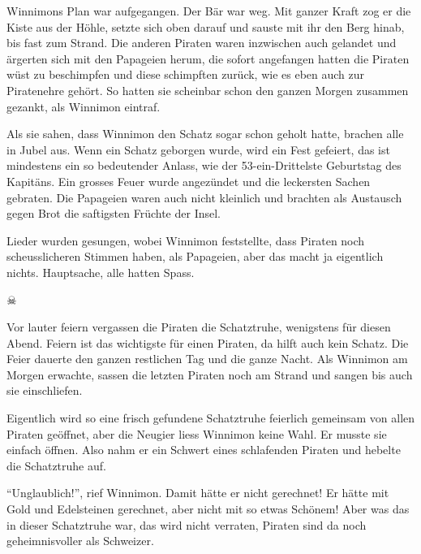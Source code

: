 Winnimons Plan war aufgegangen. Der Bär war weg. Mit ganzer Kraft zog er die Kiste aus der Höhle, setzte sich oben darauf und sauste mit ihr den Berg hinab, bis fast zum Strand. Die anderen Piraten waren inzwischen auch gelandet und ärgerten sich mit den Papageien herum, die sofort angefangen hatten die Piraten wüst zu beschimpfen und diese schimpften zurück, wie es eben auch zur Piratenehre gehört. So hatten sie scheinbar schon den ganzen Morgen zusammen gezankt, als Winnimon eintraf.

Als sie sahen, dass Winnimon den Schatz sogar schon geholt hatte, brachen alle in Jubel aus. Wenn ein Schatz geborgen wurde, wird ein Fest gefeiert, das ist mindestens ein so bedeutender Anlass, wie der 53-ein-Drittelste Geburtstag des Kapitäns. Ein grosses Feuer wurde angezündet und die leckersten Sachen gebraten. Die Papageien waren auch nicht kleinlich und brachten als Austausch gegen Brot die saftigsten Früchte der Insel. 

Lieder wurden gesungen, wobei Winnimon feststellte, dass Piraten noch scheusslicheren Stimmen haben, als Papageien, aber das macht ja eigentlich nichts. Hauptsache, alle hatten Spass.


\begin{center}
{ $\skull$}
\end{center}

Vor lauter feiern vergassen die Piraten die Schatztruhe, wenigstens für diesen Abend. Feiern ist das wichtigste für einen Piraten, da hilft auch kein Schatz. Die Feier dauerte den ganzen restlichen Tag und die ganze Nacht. Als Winnimon am Morgen erwachte, sassen die letzten Piraten noch am Strand und sangen bis auch sie einschliefen.

Eigentlich wird so eine frisch gefundene Schatztruhe feierlich gemeinsam von allen Piraten geöffnet, aber die Neugier liess Winnimon keine Wahl. Er musste sie einfach öffnen. Also nahm er ein Schwert eines schlafenden Piraten und hebelte die Schatztruhe auf.

\enquote{Unglaublich!}, rief Winnimon. Damit hätte er nicht gerechnet! Er hätte mit Gold und Edelsteinen gerechnet, aber nicht mit so etwas Schönem! Aber was das in dieser Schatztruhe war, das wird nicht verraten, Piraten sind da noch geheimnisvoller als Schweizer. \hfill {\color{DeepPink}\decofourleft}
